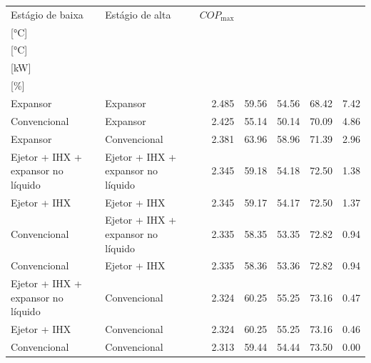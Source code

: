 {\small\setlength{\tabcolsep}{4pt}\renewcommand{\arraystretch}{1.12}
\begin{tabular}{llrrrrr}
\toprule
Estágio de baixa & Estágio de alta & $COP_{\max}$ & \shortstack{$T_{\mathrm{cond,l}}^*$\\{[°C]}} & \shortstack{$T_{\mathrm{evap,h}}^*$\\{[°C]}} & \shortstack{$\dot W_{\mathrm{liq}}$\\{[kW]}} & \shortstack{$\Delta COP_{\mathrm{opt}}$\\{[\%]}} \\
\midrule
Expansor & Expansor & 2.485 & 59.56 & 54.56 & 68.42 & 7.42 \\
Convencional & Expansor & 2.425 & 55.14 & 50.14 & 70.09 & 4.86 \\
Expansor & Convencional & 2.381 & 63.96 & 58.96 & 71.39 & 2.96 \\
Ejetor + IHX + expansor no líquido & Ejetor + IHX + expansor no líquido & 2.345 & 59.18 & 54.18 & 72.50 & 1.38 \\
Ejetor + IHX & Ejetor + IHX & 2.345 & 59.17 & 54.17 & 72.50 & 1.37 \\
Convencional & Ejetor + IHX + expansor no líquido & 2.335 & 58.35 & 53.35 & 72.82 & 0.94 \\
Convencional & Ejetor + IHX & 2.335 & 58.36 & 53.36 & 72.82 & 0.94 \\
Ejetor + IHX + expansor no líquido & Convencional & 2.324 & 60.25 & 55.25 & 73.16 & 0.47 \\
Ejetor + IHX & Convencional & 2.324 & 60.25 & 55.25 & 73.16 & 0.46 \\
Convencional & Convencional & 2.313 & 59.44 & 54.44 & 73.50 & 0.00 \\
\bottomrule
\end{tabular}
}

